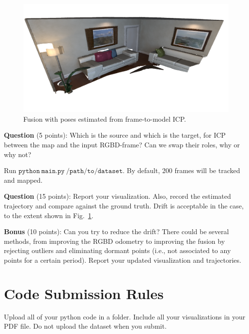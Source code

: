 \documentclass[12pt, a4paper]{article}
\begin{document}
\begin{figure}
	\includegraphics[width=\textwidth]{figures/fusion_icp.png}
	\caption{Fusion with poses estimated from frame-to-model ICP.}\label{fig:fusion-icp}
\end{figure}
\textbf{Question} (5 points): Which is the source and which is the target, for ICP between the map and the input RGBD-frame? Can we swap their roles, why or why not?

Run $\mathtt{python~main.py~/path/to/dataset}$. By default, 200 frames will be tracked and mapped.

\textbf{Question} (15 points): Report your visualization. Also, record the estimated trajectory and compare against the ground truth. Drift is acceptable in the case, to the extent shown in Fig.~\ref{fig:fusion-icp}.

\textbf{Bonus} (10 points): Can you try to reduce the drift? There could be several methods, from improving the RGBD odometry to improving the fusion by rejecting outliers and eliminating dormant points (i.e., not associated to any points for a certain period). Report your updated visualization and trajectories.

\section{Code Submission Rules}

Upload all of your python code in a folder.
Include all your visualizations in your PDF file.
Do not upload the dataset when you submit.
\end{document}

